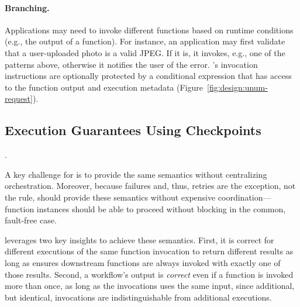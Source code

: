 \paragraph{Branching.}
Applications may need to invoke different functions based on runtime conditions
(e.g., the output of a function). For instance, an application may first
validate that a user-uploaded photo is a valid JPEG. If it is, it invokes, e.g.,
one of the patterns above, otherwise it notifies the user of the error.
\name{}'s invocation instructions are optionally protected by a conditional
expression that has access to the function output and execution metadata
(Figure~\ref{fig:design:unum-request}).



\subsection{Execution Guarantees Using Checkpoints}\label{sec:design:execution}


.

A key challenge for \name{} is to provide the same semantics without
centralizing orchestration. Moreover, because failures and, thus, retries are
the exception, not the rule, \name{} should provide these semantics without
expensive coordination---function instances should be able to proceed without
blocking in the common, fault-free case.

\name{} leverages two key insights to achieve these semantics.  First, it is
 correct for different executions of the same function invocation to return
 different results as long as \name{} ensures downstream functions are always
 invoked with exactly one of those results. Second, a workflow's output is
\emph{correct} even if a function is invoked more than once, as long as the
invocations uses the same input, since additional, but identical, invocations
are indistinguishable from additional executions.

